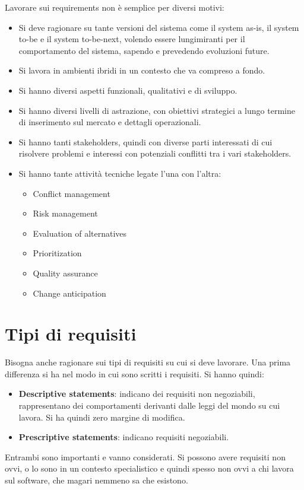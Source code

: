 Lavorare sui requirements non è semplice per diversi motivi:
\begin{itemize}
    \item Si deve ragionare su tante versioni del sistema come il system as-is, il system to-be e il system to-be-next, volendo essere lungimiranti per il comportamento del sistema, sapendo e prevedendo evoluzioni future.
    \item Si lavora in ambienti ibridi in un contesto che va compreso a fondo.
    \item Si hanno diversi aspetti funzionali, qualitativi e di sviluppo.
    \item Si hanno diversi livelli di astrazione, con obiettivi strategici a lungo termine di inserimento sul mercato e dettagli operazionali.
    \item Si hanno tanti stakeholders, quindi con diverse parti interessati di cui risolvere problemi e interessi con potenziali conflitti tra i vari stakeholders.
    \item Si hanno tante attività tecniche legate l'una con l'altra:
    \begin{itemize}
        \item Conflict management
        \item Risk management
        \item Evaluation of alternatives
        \item Prioritization
        \item Quality assurance
        \item Change anticipation
    \end{itemize}
\end{itemize}
\section{Tipi di requisiti}
Bisogna anche ragionare sui tipi di requisiti su cui si deve lavorare. Una prima differenza si ha nel modo in cui sono scritti i requisiti. Si hanno quindi:
\begin{itemize}
    \item \textbf{Descriptive statements}: indicano dei requisiti non negoziabili, rappresentano dei comportamenti derivanti dalle leggi del mondo su cui lavora. Si ha quindi zero margine di modifica.
    \item \textbf{Prescriptive statements}: indicano requisiti negoziabili.
\end{itemize}

Entrambi sono importanti e vanno considerati. Si possono avere requisiti non ovvi, o lo sono in un contesto specialistico e quindi spesso non ovvi a chi lavora sul software, che magari nemmeno sa che esistono.

